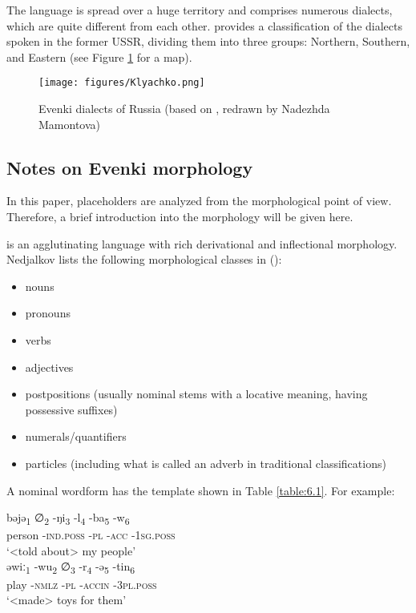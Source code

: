 \documentclass[output=paper,colorlinks,citecolor=brown]{langscibook}
\begin{document}
The  language is spread over a huge territory and comprises numerous dialects, which are quite different from each other. \citet{Vasilevich1948} provides a classification of the  dialects spoken in the former USSR, dividing them into three groups: Northern, Southern, and Eastern (see Figure \ref{fig:6:1} for a map).

\begin{figure}
\texttt{[image: figures/Klyachko.png]}
\caption{Evenki dialects of Russia (based on \citealt{Vasilevich1948}, redrawn by Nadezhda Mamontova)}
\label{fig:6:1}
\end{figure}

\subsection{Notes on Evenki morphology}

In this paper, placeholders are analyzed from the morphological point of view. Therefore, a brief introduction into the  morphology will be given here.

 is an agglutinating language with rich derivational and inflectional morphology. Nedjalkov lists the following morphological classes in  (\citealt[139--140]{Nedjalkov1997}):

\begin{itemize}
  \item nouns
  \item pronouns
  \item verbs
  \item adjectives
  \item postpositions (usually nominal stems with a locative meaning, having possessive suffixes)
  \item numerals/quantifiers
  \item particles (including what is called an adverb in traditional classifications)
\end{itemize}

A nominal wordform has the template shown in Table \ref{table:6.1}. For example:



\ea
    \label{example6.1}
    \gll bəjə\textsubscript{1}{ }   {∅}\textsubscript{2}{ }		-ŋi\textsubscript{3}{ }	-l\textsubscript{4}{ }	-ba\textsubscript{5}{ }	-w\textsubscript{6}\\
    person {}	\textsc{-ind.poss}	\textsc{-pl}	\textsc{-acc} \textsc{-1sg.poss}\\
    \glt `<told about> my people'\\
\ex
    \label{example6.2}
    \gll əwiː\textsubscript{1}{ } -wu\textsubscript{2}{ } {∅}\textsubscript{3}{ }		-r\textsubscript{4}{ }	-ə\textsubscript{5}{ }	-tin\textsubscript{6}\\
    	play	\textsc{-nmlz} {}		\textsc{-pl}	\textsc{-accin}	\textsc{-3pl.poss}\\
    \glt `<made> toys for them’
    \z
\end{document}
